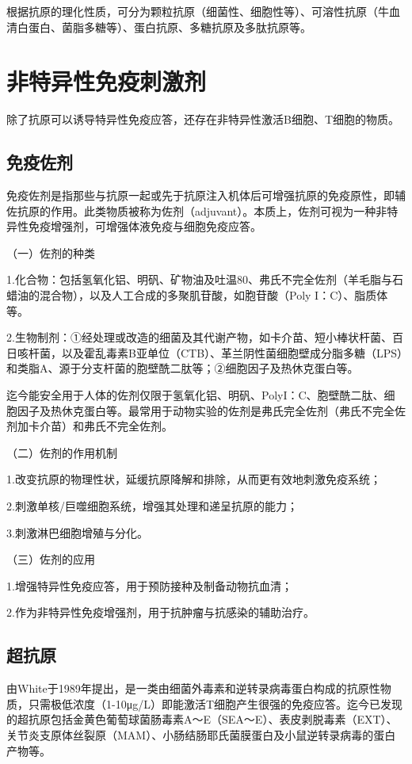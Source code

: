 根据抗原的理化性质，可分为颗粒抗原（细菌性、细胞性等）、可溶性抗原（牛血清白蛋白、菌脂多糖等）、蛋白抗原、多糖抗原及多肽抗原等。

\section{非特异性免疫刺激剂}

除了抗原可以诱导特异性免疫应答，还存在非特异性激活B细胞、T细胞的物质。


\subsection{免疫佐剂}

免疫佐剂是指那些与抗原一起或先于抗原注入机体后可增强抗原的免疫原性，即辅佐抗原的作用。此类物质被称为佐剂（adjuvant）。本质上，佐剂可视为一种非特异性免疫增强剂，可增强体液免疫与细胞免疫应答。

（一）佐剂的种类

1.化合物：包括氢氧化铝、明矾、矿物油及吐温80、弗氏不完全佐剂（羊毛脂与石蜡油的混合物），以及人工合成的多聚肌苷酸，如胞苷酸（Poly
I：C）、脂质体等。

2.生物制剂：①经处理或改造的细菌及其代谢产物，如卡介苗、短小棒状杆菌、百日咳杆菌，以及霍乱毒素B亚单位（CTB）、革兰阴性菌细胞壁成分脂多糖（LPS）和类脂A、源于分支杆菌的胞壁酰二肽等；②细胞因子及热休克蛋白等。

迄今能安全用于人体的佐剂仅限于氢氧化铝、明矾、PolyI：C、胞壁酰二肽、细胞因子及热休克蛋白等。最常用于动物实验的佐剂是弗氏完全佐剂（弗氏不完全佐剂加卡介苗）和弗氏不完全佐剂。

（二）佐剂的作用机制

1.改变抗原的物理性状，延缓抗原降解和排除，从而更有效地刺激免疫系统；

2.刺激单核/巨噬细胞系统，增强其处理和递呈抗原的能力；

3.刺激淋巴细胞增殖与分化。

（三）佐剂的应用

1.增强特异性免疫应答，用于预防接种及制备动物抗血清；

2.作为非特异性免疫增强剂，用于抗肿瘤与抗感染的辅助治疗。


\subsection{超抗原}

由White于1989年提出，是一类由细菌外毒素和逆转录病毒蛋白构成的抗原性物质，只需极低浓度（1-10μg/L）即能激活T细胞产生很强的免疫应答。迄今已发现的超抗原包括金黄色葡萄球菌肠毒素A～E（SEA～E）、表皮剥脱毒素（EXT）、关节炎支原体丝裂原（MAM）、小肠结肠耶氏菌膜蛋白及小鼠逆转录病毒的蛋白产物等。

